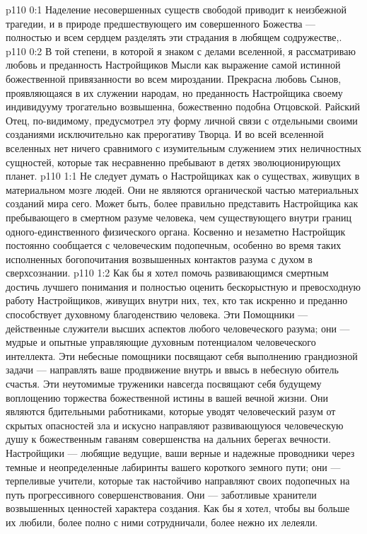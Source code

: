 \vs p110 0:1 Наделение несовершенных существ свободой приводит к неизбежной трагедии, и в природе предшествующего им совершенного Божества --- полностью и всем сердцем разделять эти страдания в любящем содружестве,.
\vs p110 0:2 В той степени, в которой я знаком с делами вселенной, я рассматриваю любовь и преданность Настройщиков Мысли как выражение самой истинной божественной привязанности во всем мироздании. Прекрасна любовь Сынов, проявляющаяся в их служении народам, но преданность Настройщика своему индивидууму трогательно возвышенна, божественно подобна Отцовской. Райский Отец, по\hyp{}видимому, предусмотрел эту форму личной связи с отдельными своими созданиями исключительно как прерогативу Творца. И во всей вселенной вселенных нет ничего сравнимого с изумительным служением этих неличностных сущностей, которые так несравненно пребывают в детях эволюционирующих планет.
\vs p110 1:1 Не следует думать о Настройщиках как о существах, живущих в материальном мозге людей. Они не являются органической частью материальных созданий мира сего. Может быть, более правильно представить Настройщика как пребывающего в смертном разуме человека, чем существующего внутри границ одного\hyp{}единственного физического органа. Косвенно и незаметно Настройщик постоянно сообщается с человеческим подопечным, особенно во время таких исполненных богопочитания возвышенных контактов разума с духом в сверхсознании.
\vs p110 1:2 Как бы я хотел помочь развивающимся смертным достичь лучшего понимания и полностью оценить бескорыстную и превосходную работу Настройщиков, живущих внутри них, тех, кто так искренно и преданно способствует духовному благоденствию человека. Эти Помощники --- действенные служители высших аспектов любого человеческого разума; они --- мудрые и опытные управляющие духовным потенциалом человеческого интеллекта. Эти небесные помощники посвящают себя выполнению грандиозной задачи --- направлять ваше продвижение внутрь и ввысь в небесную обитель счастья. Эти неутомимые труженики навсегда посвящают себя будущему воплощению торжества божественной истины в вашей вечной жизни. Они являются бдительными работниками, которые уводят человеческий разум от скрытых опасностей зла и искусно направляют развивающуюся человеческую душу к божественным гаваням совершенства на дальних берегах вечности. Настройщики --- любящие ведущие, ваши верные и надежные проводники через темные и неопределенные лабиринты вашего короткого земного пути; они --- терпеливые учители, которые так настойчиво направляют своих подопечных на путь прогрессивного совершенствования. Они --- заботливые хранители возвышенных ценностей характера создания. Как бы я хотел, чтобы вы больше их любили, более полно с ними сотрудничали, более нежно их лелеяли.
